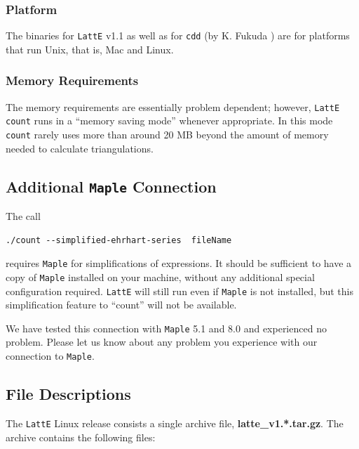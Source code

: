 \documentclass{article}
\newcommand{\latte}{{\tt LattE}\xspace}
\newcommand{\maple}{{\tt Maple}\xspace}
\begin{document}
\subsubsection{Platform} 
The binaries for \latte v1.1 as well as for {\tt cdd} (by
K. Fukuda \cite{fukuda}) are for platforms that run Unix, that is, Mac and Linux.

\subsubsection{Memory Requirements} 
The memory requirements are essentially problem dependent; however,
{\tt LattE count} runs in a ``memory saving mode'' whenever appropriate.
In this mode {\tt count} rarely uses more than around 20 MB beyond the
amount of memory needed to calculate triangulations. 

\subsection{Additional \maple Connection}
The call
\begin{verbatim}
./count --simplified-ehrhart-series  fileName
\end{verbatim}
requires \maple for simplifications of expressions. It should be
sufficient to have a copy of \maple installed on your machine,
without any additional special configuration required.  \latte
will still run even if \maple is not installed, but this
simplification feature to ``count'' will not be available. 

We have tested this connection with \maple 5.1 and 8.0 and experienced
no problem. Please let us know about any problem you experience with
our connection to \maple.

\subsection{File Descriptions} 
\label{section:file-descriptions}
The {\tt LattE} Linux release consists a single archive file,
\textbf{latte\_v1.*.tar.gz}. The archive contains the following files:
\end{document}
